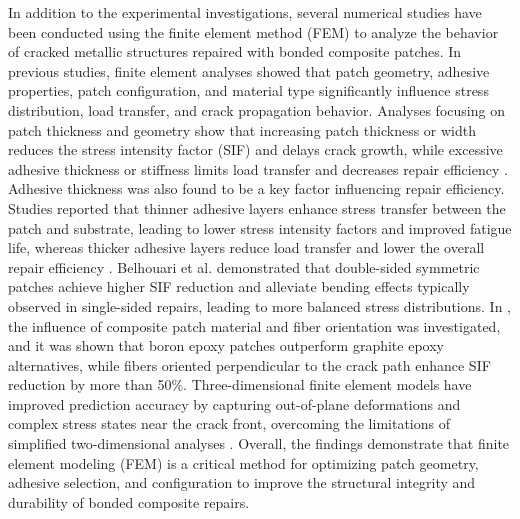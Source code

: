 \documentclass[journal,article,submit,pdftex,moreauthors]{Definitions/mdpi}
\begin{document}
In addition to the experimental investigations, several numerical studies have been conducted using the finite element method (FEM) to analyze the behavior of cracked metallic structures repaired with bonded composite patches. In previous studies, finite element analyses showed that patch geometry, adhesive properties, patch configuration, and material type significantly influence stress distribution, load transfer, and crack propagation behavior. Analyses focusing on patch thickness and geometry show that increasing patch thickness or width reduces the stress intensity factor (SIF) and delays crack growth, while excessive adhesive thickness or stiffness limits load transfer and decreases repair efficiency \cite{Papanikos,BouiadjrA,Gunes,Achour}. Adhesive thickness was also found to be a key factor influencing repair efficiency. Studies reported that thinner adhesive layers enhance stress transfer between the patch and substrate, leading to lower stress intensity factors and improved fatigue life, whereas thicker adhesive layers reduce load transfer and lower the overall repair efficiency \cite{Walde}. Belhouari et al.\cite{Serier} demonstrated that double-sided symmetric patches achieve higher SIF reduction and alleviate bending effects typically observed in single-sided repairs, leading to more balanced stress distributions. In \cite{Ouinas}, the influence of composite patch material and fiber orientation was investigated, and it was shown that boron epoxy patches outperform graphite epoxy alternatives, while fibers oriented perpendicular to the crack path enhance SIF reduction by more than 50\%. Three-dimensional finite element models have improved prediction accuracy by capturing out-of-plane deformations and complex stress states near the crack front, overcoming the limitations of simplified two-dimensional analyses \cite{Ripi}. Overall, the findings demonstrate that finite element modeling (FEM) is a critical method for optimizing patch geometry, adhesive selection, and configuration to improve the structural integrity and durability of bonded composite repairs.
\end{document}
